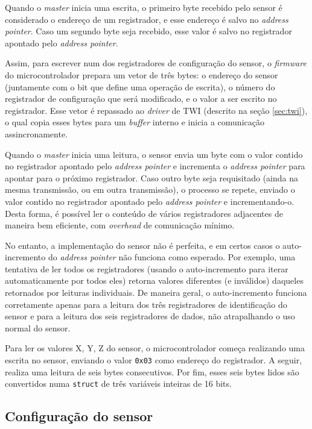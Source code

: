 \documentclass[brazil,pagestart=firstchapter]{abnt}
\begin{document}
Quando o \textit{master} inicia uma escrita, o primeiro byte recebido pelo
sensor é considerado o endereço de um registrador, e esse endereço é salvo
no \textit{address pointer}. Caso um segundo byte seja recebido, esse valor
é salvo no registrador apontado pelo \textit{address pointer}.

Assim, para escrever num dos registradores de configuração do sensor, o
\textit{firmware} do microcontrolador prepara um vetor de três bytes: o
endereço do sensor (juntamente com o bit que define uma operação de
escrita), o número do registrador de configuração que será modificado, e o
valor a ser escrito no registrador. Esse vetor é repassado ao
\textit{driver} de \ac{TWI} (descrito na seção \ref{sec:twi}), o qual copia
esses bytes para um \textit{buffer} interno e inicia a comunicação
assincronamente.

Quando o \textit{master} inicia uma leitura, o sensor envia um byte com o
valor contido no registrador apontado pelo \textit{address pointer} e
incrementa o \textit{address pointer} para apontar para o próximo
registrador. Caso outro byte seja requisitado (ainda na mesma transmissão,
ou em outra transmissão), o processo se repete, enviado o valor contido no
registrador apontado pelo \textit{address pointer} e incrementando-o. Desta
forma, é possível ler o conteúdo de vários registradores adjacentes de
maneira bem eficiente, com \textit{overhead} de comunicação mínimo.

No entanto, a implementação do sensor não é perfeita, e em certos casos o
auto-incremento do \textit{address pointer} não funciona como esperado. Por
exemplo, uma tentativa de ler todos os registradores (usando o
auto-incremento para iterar automaticamente por todos eles) retorna valores
diferentes (e inválidos) daqueles retornados por leituras individuais. De
maneira geral, o auto-incremento funciona corretamente apenas para a leitura
dos três registradores de identificação do sensor e para a leitura dos seis
registradores de dados, não atrapalhando o uso normal do sensor.

Para ler os valores X, Y, Z do sensor, o microcontrolador começa realizando
uma escrita no sensor, enviando o valor \texttt{0x03} como endereço do
registrador. A seguir, realiza uma leitura de seis bytes consecutivos. Por
fim, esses seis bytes lidos são convertidos numa \texttt{struct} de três
variáveis inteiras de 16 bits.

\subsection{Configuração do sensor}
\label{sub:software_sensor_config}
\end{document}
